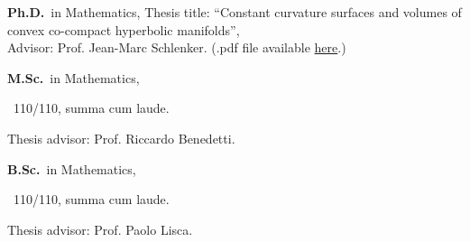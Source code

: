 	{%
		\textbf{Ph.D.}~in Mathematics,}
	{%
	Thesis title: ``Constant curvature surfaces and volumes of convex co-compact hyperbolic manifolds'', \\
	Advisor: Prof. Jean-Marc Schlenker. (.pdf file available \href{https://orbilu.uni.lu/handle/10993/43901}{here}.)}

		{%
			\textbf{M.Sc.}~in Mathematics, \begin{footnotesize}
			~110/110, summa cum laude.
		\end{footnotesize}}
		{Thesis advisor: Prof. Riccardo Benedetti.}

{%
	\textbf{B.Sc.}~in Mathematics, \begin{footnotesize}
	~110/110, summa cum laude.
\end{footnotesize}}{Thesis advisor: Prof. Paolo Lisca.}